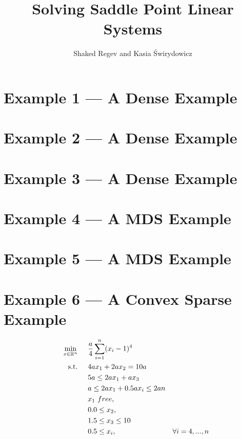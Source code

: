 \documentclass[11pt,letterpaper]{article}
\title{$ $
\\[-100pt] Solving Saddle Point Linear Systems}
\author{Shaked Regev and Kasia \'{S}wirydowicz}
\begin{document}
\section{Example 1 --- A Dense Example}
\section{Example 2 --- A Dense Example}
\section{Example 3 --- A Dense Example}
\section{Example 4 --- A MDS Example}
\section{Example 5 --- A MDS Example}

\section{Example 6 --- A Convex Sparse Example}
\begin{align}
&&&&\min_{x\in\mathbb{R}^n} & \hspace{0.5cm} \frac{a}{4}\sum_{i=1}^{n} (x_i-1)^4 &&&& \label{ex6:obj}\\
&&&&\textnormal{s.t.} &\hspace{0.5cm}  4ax_1+2ax_2 = 10a &&&& \label{ex6:eq1}\\
&&&&& \hspace{0.5cm} 5a \leq  2ax_1 + ax_3                 &&&& \label{ex6:ineq1}\\
&&&&& \hspace{0.5cm}  a \leq  2ax_1       + 0.5ax_i \leq 2an &&&& \label{ex6:ineq2}\\
&&&&& \hspace{0.5cm}  x_1~free, &&&& \label{ex6:varb1}\\
&&&&& \hspace{0.5cm}  0.0 \leq x_2, &&&& \label{ex6:varb2}\\
&&&&& \hspace{0.5cm}  1.5 \leq x_3 \leq 10  &&&& \label{ex6:varb3}\\
&&&&& \hspace{0.5cm}  0.5 \leq x_i, &\forall i=4,...,n               &&& \label{ex6:varb4}
\end{align}
\end{document}
